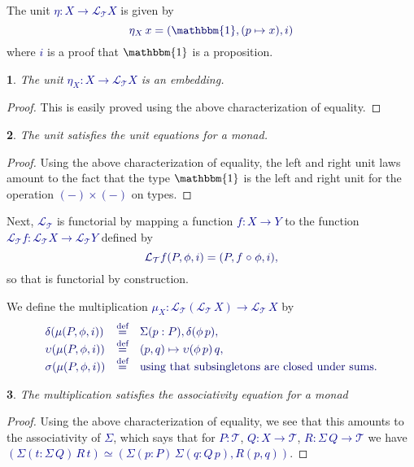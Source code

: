 \documentclass[10pt]{article}
\newcommand{\db}{\textcolor{darkblue}}
\newcommand{\m}[1]{\db{$#1$}}
\newcommand{\M}[1]{\[\db{#1}\]}
\newcommand{\comp}{\mathrel{\circ}}
\newcommand{\U}{\mathcal{U}}
\newcommand{\V}{\mathcal{V}}
\newcommand{\T}{\mathcal{T}}
\newcommand{\Lift}{\mathcal{L}}
\newcommand{\One}{\mathbbm{1}}
\newcommand{\eqdef}{\overset{\text{def}}{=}}
\newtheorem{numbered}{}
\theoremstyle{definition}
\begin{document}
The unit \m{\eta : X
  \to \Lift_\T X} is given by \M{\eta_X \, x = (\One, (p \mapsto x), i)}
where \m{i} is a proof that \m{\One} is a proposition.
\begin{numbered}
  The unit \m{\eta_X : X\to\Lift_\T X} is an embedding.
\end{numbered}
\begin{proof}
  This is easily proved using the above characterization of equality.
\end{proof}
\begin{numbered}
  The unit satisfies the unit equations for a monad.
\end{numbered}
\begin{proof}
  Using the above characterization of equality, the left and right
  unit laws amount to the fact that the type \m{\One} is the left
  and right unit for the operation \m{(-)\times(-)} on types.
\end{proof}
\noindent Next, \m{\Lift_\T} is functorial by mapping a function
\m{f : X \to Y} to the function \m{\Lift_\T f : \Lift_\T X \to \Lift_\T Y}
defined by
%
\M{
\Lift_\T f (P , \phi , i) = (P , f \comp \phi , i),
}
%
so that is functorial by construction.
%
%

We define the multiplication \m{\mu_X : \Lift_{\T} (\Lift_{\T}\, X) \to \Lift_{\T}\, X} by
%
\M{
  \begin{array}{lll}
  \delta (\mu (P , \phi , i)) & \eqdef & \Sigma (p : P), \delta (\phi \, p), \\
  \upsilon (\mu (P , \phi , i)) & \eqdef & (p , q) \mapsto \upsilon (\phi \, p) \, q , \\
  \sigma (\mu (P , \phi , i)) & \eqdef & \text{using that subsingletons are closed under sums.} \\
  \end{array}
}
%
\begin{numbered}
  The multiplication satisfies the associativity equation for a monad
\end{numbered}
\begin{proof}
  Using the above characterization of equality, we see that this
  amounts to the associativity of \m{\Sigma}, which says that for
  \m{P:\T}, \m{Q: X \to \T}, \m{R : \Sigma \, Q \to \T} we have
   \m{(\Sigma (t : \Sigma \, Q)\, R \, t) \simeq (\Sigma (p : P)\,
    \Sigma (q : Q \, p), R(p,q))}.
\end{proof}
\end{document}

